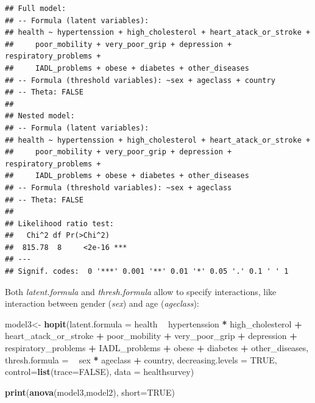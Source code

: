 \documentclass[]{article}
\newenvironment{Shaded}{\begin{snugshade}}{\end{snugshade}}
\newcommand{\DataTypeTok}[1]{\textcolor[rgb]{0.13,0.29,0.53}{#1}}
\newcommand{\KeywordTok}[1]{\textcolor[rgb]{0.13,0.29,0.53}{\textbf{#1}}}
\newcommand{\NormalTok}[1]{#1}
\newcommand{\OperatorTok}[1]{\textcolor[rgb]{0.81,0.36,0.00}{\textbf{#1}}}
\newcommand{\OtherTok}[1]{\textcolor[rgb]{0.56,0.35,0.01}{#1}}
\newcommand{\StringTok}[1]{\textcolor[rgb]{0.31,0.60,0.02}{#1}}
\begin{document}
\begin{verbatim}
## Full model:
## -- Formula (latent variables): 
## health ~ hypertenssion + high_cholesterol + heart_atack_or_stroke +  
##     poor_mobility + very_poor_grip + depression + respiratory_problems +  
##     IADL_problems + obese + diabetes + other_diseases
## -- Formula (threshold variables): ~sex + ageclass + country
## -- Theta: FALSE
## 
## Nested model:
## -- Formula (latent variables): 
## health ~ hypertenssion + high_cholesterol + heart_atack_or_stroke +  
##     poor_mobility + very_poor_grip + depression + respiratory_problems +  
##     IADL_problems + obese + diabetes + other_diseases
## -- Formula (threshold variables): ~sex + ageclass
## -- Theta: FALSE
## 
## Likelihood ratio test:
##   Chi^2 df Pr(>Chi^2)    
##  815.78  8     <2e-16 ***
## ---
## Signif. codes:  0 '***' 0.001 '**' 0.01 '*' 0.05 '.' 0.1 ' ' 1
\end{verbatim}

Both \emph{latent.formula} and \emph{thresh.formula} allow to specify
interactions, like interaction between gender (\emph{sex}) and age
(\emph{ageclass}):

\begin{Shaded}
\begin{Highlighting}[]
\NormalTok{model3<-}\StringTok{ }\KeywordTok{hopit}\NormalTok{(}\DataTypeTok{latent.formula =}\NormalTok{ health }\OperatorTok{~}\StringTok{ }\NormalTok{hypertenssion }\OperatorTok{*}\StringTok{ }\NormalTok{high_cholesterol }\OperatorTok{+}\StringTok{ }
\StringTok{                             }\NormalTok{heart_atack_or_stroke }\OperatorTok{+}\StringTok{ }\NormalTok{poor_mobility }\OperatorTok{+}\StringTok{ }
\StringTok{                             }\NormalTok{very_poor_grip }\OperatorTok{+}\StringTok{ }\NormalTok{depression }\OperatorTok{+}\StringTok{ }\NormalTok{respiratory_problems }\OperatorTok{+}\StringTok{ }
\StringTok{                             }\NormalTok{IADL_problems }\OperatorTok{+}\StringTok{ }\NormalTok{obese }\OperatorTok{+}\StringTok{ }\NormalTok{diabetes }\OperatorTok{+}\StringTok{ }\NormalTok{other_diseases, }
               \DataTypeTok{thresh.formula =} \OperatorTok{~}\StringTok{ }\NormalTok{sex }\OperatorTok{*}\StringTok{ }\NormalTok{ageclass }\OperatorTok{+}\StringTok{ }\NormalTok{country,}
               \DataTypeTok{decreasing.levels =} \OtherTok{TRUE}\NormalTok{,}
               \DataTypeTok{control=}\KeywordTok{list}\NormalTok{(}\DataTypeTok{trace=}\OtherTok{FALSE}\NormalTok{),}
               \DataTypeTok{data =}\NormalTok{ healthsurvey)}

\KeywordTok{print}\NormalTok{(}\KeywordTok{anova}\NormalTok{(model3,model2), }\DataTypeTok{short=}\OtherTok{TRUE}\NormalTok{)}
\end{Highlighting}
\end{Shaded}
\end{document}
